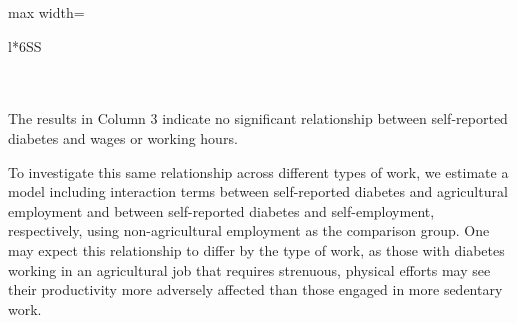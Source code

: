 \documentclass[12pt,english,british]{article}
\newcommand{\sym}[1]{\rlap{#1}}%
\begin{document}
\begin{table}[h]
\begin{center}
\begin{adjustbox}{max width=\textwidth}
{\begin{tabular}{l*{6}{SS}}
\\
\\
\multicolumn{7}{l}{\footnotesize \sym{*} \(p<0.10\), \sym{**} \(p<0.05\), \sym{***} \(p<0.01\).}\\
\end{tabular}%
}
\end{adjustbox}
\end{center}
\end{table}

The results in Column 3 indicate no significant relationship between self-reported diabetes and
wages or working hours.

To investigate this same relationship across different types of work, we estimate
a model including interaction terms between self-reported diabetes
and agricultural employment and between self-reported diabetes and
self-employment, respectively, using non-agricultural employment as
the comparison group. One may expect this relationship to differ by the type of work, as
those  with diabetes working in an agricultural job that requires strenuous,
physical efforts may see their productivity more adversely affected than those engaged in more sedentary work. 
\end{document}
